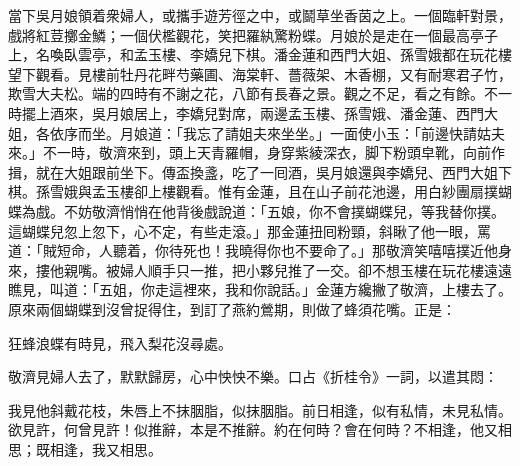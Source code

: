 當下吳月娘領着衆婦人，或攜手遊芳徑之中，或鬬草坐香茵之上。一個臨軒對景，戲將紅荳擲金鱗；一個伏檻觀花，笑把羅紈驚粉蝶。{}月娘於是走在一個最高亭子上，名喚臥雲亭，和孟玉樓、李嬌兒下棋。潘金蓮和西門大姐、孫雪娥都在玩花樓望下觀看。見樓前牡丹花畔芍藥圃、海棠軒、薔薇架、木香棚，又有耐寒君子竹，欺雪大夫松。端的四時有不謝之花，八節有長春之景。觀之不足，看之有餘。不一時擺上酒來，吳月娘居上，李嬌兒對席，兩邊孟玉樓、孫雪娥、潘金蓮、西門大姐，各依序而坐。月娘道：「我忘了請姐夫來坐坐。」{}一面使小玉：「前邊快請姑夫來。」不一時，敬濟來到，頭上天青羅帽，身穿紫綾深衣，脚下粉頭皁靴，向前作揖，就在大姐跟前坐下。傳盃換盞，吃了一囘酒，吳月娘還與李嬌兒、西門大姐下棋。孫雪娥與孟玉樓卻上樓觀看。惟有金蓮，且在山子前花池邊，用白紗團扇撲蝴蝶為戲。不妨敬濟悄悄在他背後戲說道：「五娘，你不會撲蝴蝶兒，等我替你撲。這蝴蝶兒忽上忽下，心不定，有些走滾。」{}那金蓮扭囘粉頸，斜瞅了他一眼，罵道：「賊短命，人聽着，你待死也！我曉得你也不要命了。」{}那敬濟笑嘻嘻撲近他身來，摟他親嘴。被婦人順手只一推，把小夥兒推了一交。卻不想玉樓在玩花樓遠遠瞧見，叫道：「五姐，你走這裡來，我和你說話。」金蓮方纔撇了敬濟，上樓去了。原來兩個蝴蝶到沒曾捉得住，到訂了燕約鶯期，則做了蜂須花嘴。正是：

\begin{myquote}
狂蜂浪蝶有時見，飛入梨花沒尋處。
\end{myquote}

敬濟見婦人去了，默默歸房，心中怏怏不樂。口占《折桂令》一詞，以遣其悶：

\begin{myquote}
我見他斜戴花枝，朱唇上不抹胭脂，似抹胭脂。前日相逢，似有私情，未見私情。欲見許，何曾見許！似推辭，本是不推辭。約在何時？會在何時？不相逢，他又相思；既相逢，我又相思。
\end{myquote}

